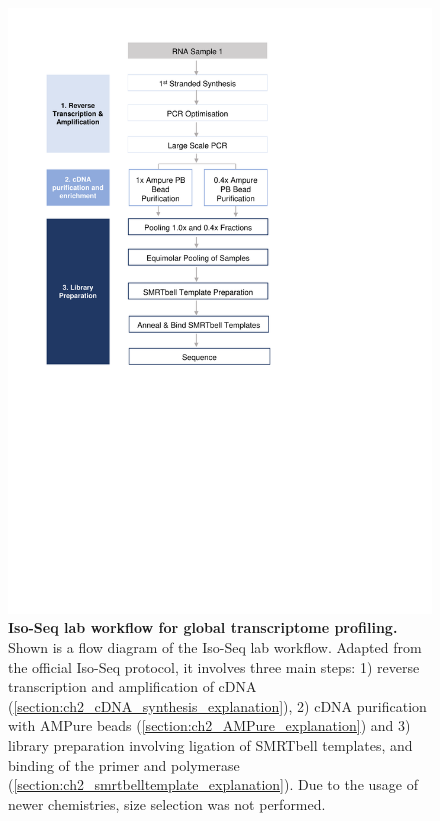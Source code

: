 \begin{figure}[htp]
	\includegraphics[page=1,trim={0 12cm 5cm 1cm},clip,scale = 1]{Figures/ProjectDevelopment_Figures.pdf}
	\captionsetup{width=0.95\textwidth}
	\caption[Iso-Seq lab workflow for global transcriptome profiling]%
	{\textbf{Iso-Seq lab workflow for global transcriptome profiling.} Shown is a flow diagram of the Iso-Seq lab workflow. Adapted from the official Iso-Seq protocol, it involves three main steps: 1) reverse transcription and amplification of cDNA (\cref{section:ch2_cDNA_synthesis_explanation}), 2) cDNA purification with AMPure beads (\cref{section:ch2_AMPure_explanation}) and 3) library preparation involving ligation of SMRTbell templates, and binding of the primer and polymerase (\cref{section:ch2_smrtbelltemplate_explanation}). Due to the usage of newer chemistries, size selection was not performed.}
	\label{fig:isoseq_wholelab_protocol}
\end{figure}

